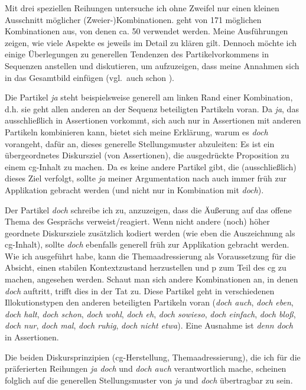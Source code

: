 \noindent
Mit drei speziellen Reihungen untersuche ich ohne Zweifel nur einen kleinen Ausschnitt möglicher (Zweier-)Kombinationen. \citet[280]{Thurmair1989} geht von 171 möglichen Kombinationen aus, von denen ca. 50 verwendet werden. Meine Ausführungen zeigen, wie viele Aspekte es jeweils im Detail zu klären gilt. Dennoch möchte ich einige Überlegungen zu generellen Tendenzen des Partikelvor\-kommens in Sequenzen anstellen und diskutieren, um aufzuzeigen, dass meine Annahmen sich in das Gesamtbild einfügen (vgl.\ auch schon \citealt[236]{Mueller2017b}).

Die Partikel \textit{ja} steht beispielsweise generell am linken Rand einer Kombination, d.h. sie geht allen anderen an der Sequenz beteiligten Partikeln voran. Da \textit{ja}, das ausschließlich in Assertionen vorkommt, sich auch nur in Assertionen mit anderen Partikeln kombinieren kann, bietet sich meine Erklärung, warum es \textit{doch} vorangeht, dafür an, dieses generelle Stellungsmuster abzuleiten: Es ist ein übergeordnetes Diskursziel (von Assertionen), die ausgedrückte Proposition zu einem cg-Inhalt zu machen. Da es keine andere Partikel gibt, die (ausschließlich) dieses Ziel verfolgt, sollte \textit{ja} meiner Argumentation nach auch immer früh zur Applikation gebracht werden (und nicht nur in Kombination mit \textit{doch}). 

Der Partikel \textit{doch} schreibe ich zu, anzuzeigen, dass die Äußerung auf das offene Thema des Gesprächs verweist/reagiert. Wenn nicht andere (noch) höher geordnete Diskursziele zusätzlich kodiert werden (wie eben die Auszeichnung als cg-Inhalt), sollte \textit{doch} ebenfalls generell früh zur Applikation gebracht werden. Wie ich ausgeführt habe, kann die Themaadressierung als Voraussetzung für die Absicht, einen stabilen Kontextzustand herzustellen und p zum Teil des cg zu machen, angesehen werden. Schaut man sich andere Kombinationen an, in denen \textit{doch} auftritt, trifft dies in der Tat zu. Diese Partikel geht in verschiedenen Illokutionstypen den anderen beteiligten Partikeln voran (\textit{doch auch}, \textit{doch eben}, \textit{doch halt}, \textit{doch schon}, \textit{doch wohl}, \textit{doch eh}, \textit{doch sowieso}, \textit{doch einfach}, \textit{doch bloß}, \textit{doch nur}, \textit{doch mal}, \textit{doch ruhig}, \textit{doch nicht etwa}). Eine Ausnahme ist \textit{denn doch} in Assertionen.

Die beiden Diskursprinzipien (cg-Herstellung, Themaadressierung), die ich für die präferierten Reihungen \textit{ja doch} und \textit{doch auch} verantwortlich mache, scheinen folglich auf die generellen Stellungsmuster von \textit{ja} und \textit{doch} übertragbar zu sein.

